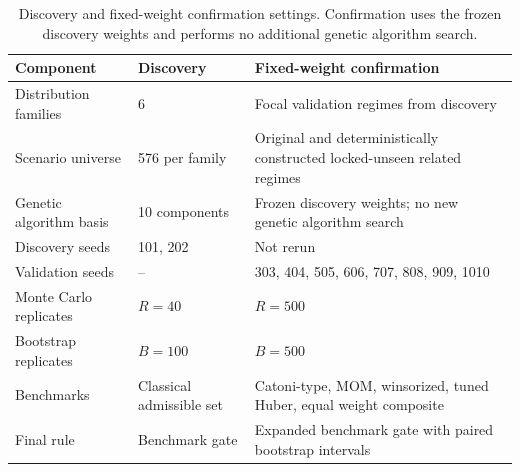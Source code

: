 \begin{table}[htbp]
\centering
\caption{Discovery and fixed-weight confirmation settings. Confirmation uses the frozen discovery weights and performs no additional genetic algorithm search.}
\label{tab:phase1_settings}
\small
\begin{tabular}{p{}p{}p{}}
\toprule
Component & Discovery & Fixed-weight confirmation \\
\midrule
Distribution families & 6 & Focal validation regimes from discovery \\
Scenario universe & 576 per family & Original and deterministically constructed locked-unseen related regimes \\
Genetic algorithm basis & 10 components & Frozen discovery weights; no new genetic algorithm search \\
Discovery seeds & 101, 202 & Not rerun \\
Validation seeds & -- & 303, 404, 505, 606, 707, 808, 909, 1010 \\
Monte Carlo replicates & $R=40$ & $R=500$ \\
Bootstrap replicates & $B=100$ & $B=500$ \\
Benchmarks & Classical admissible set & Catoni-type, MOM, winsorized, tuned Huber, equal weight composite \\
Final rule & Benchmark gate & Expanded benchmark gate with paired bootstrap intervals \\
\bottomrule
\end{tabular}
\end{table}
